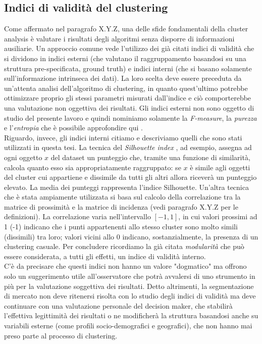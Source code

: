 \subsection{Indici di validit\`a del clustering}
\label{subsec:indici_clustering}
Come affermato nel paragrafo X.Y.Z, una delle sfide fondamentali della cluster analysis \`e valutare i risultati degli algoritmi senza disporre di informazioni ausiliarie. Un approccio comune vede l'utilizzo dei gi\`a citati indici di validit\`a che si dividono in indici esterni (che valutano il raggruppamento basandosi su una struttura pre-specificata, ground truth) e indici interni (che si basano solamente sull'informazione intrinseca dei dati). La loro scelta deve essere preceduta da un'attenta analisi dell'algoritmo di clustering, in quanto quest'ultimo potrebbe ottimizzare proprio gli stessi parametri misurati dall'indice e ci\`o comporterebbe una valutazione non oggettiva dei risultati. Gli indici esterni non sono oggetto di studio del presente lavoro e quindi nominiamo solamente la \textit{F-measure}, la \textit{purezza} e l'\textit{entropia} che \`e possibile approfondire qui \cite{rendon2011}. \\
Riguardo, invece, gli indici interni citiamo e descriviamo quelli che sono stati utilizzati in questa tesi. La tecnica del \textit{Silhouette index} \cite{Rousseeuw1987}, ad esempio, assegna ad ogni oggetto $ x $ del dataset un punteggio che, tramite una funzione di similarit\`a, calcola quanto esso sia appropriatamente raggruppato: se $ x $ \`e simile agli oggetti del cluster cui appartiene e dissimile da tutti gli altri allora ricever\`a un punteggio elevato. La media dei punteggi rappresenta l'indice Silhouette.
Un'altra tecnica che \`e stata ampiamente utilizzata si basa sul calcolo della correlazione tra la matrice di prossimit\`a e la matrice di incidenza (vedi paragrafo X.Y.Z per le definizioni). La correlazione varia nell'intervallo $ [-1, 1] $, in cui valori prossimi ad 1 (-1) indicano che i punti appartenenti allo stesso cluster sono molto simili (dissimili) tra loro; valori vicini allo 0 indicano, sostanzialmente, la presenza di un clustering casuale. Per concludere ricordiamo la gi\`a citata \textit{modularit\`a} che pu\`o essere considerata, a tutti gli effetti, un indice di validit\`a interno.\\
C'\`e da precisare che questi indici non hanno un valore "dogmatico" ma offrono solo un suggerimento utile all'osservatore che potr\`a avvalersi di uno strumento in pi\`u per la valutazione soggettiva dei risultati. Detto altrimenti, la segmentazione di mercato non deve ritenersi risolta con lo studio degli indici di validit\`a ma deve continuare con una valutazione personale del decision maker, che stabilir\`a l'effettiva legittimit\`a dei risultati o ne modificher\`a la struttura basandosi anche su variabili esterne (come profili socio-demografici e geografici), che non hanno mai preso parte al processo di clustering.

